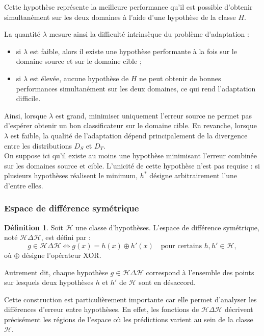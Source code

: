 \documentclass[a4paper,12pt]{article}
\theoremstyle{definition}
\newtheorem{definition}{Définition}[section]
\theoremstyle{remark}
\begin{document}
Cette hypothèse représente la meilleure performance qu’il est possible d’obtenir
simultanément sur les deux domaines à l’aide d’une hypothèse de la classe $H$.

La quantité $\lambda$ mesure ainsi la difficulté intrinsèque du problème d’adaptation :
\begin{itemize}
\item si $\lambda$ est faible, alors il existe une hypothèse performante à la fois sur le domaine source et sur le domaine cible ;
\item si $\lambda$ est élevée, aucune hypothèse de $H$ ne peut obtenir de bonnes performances simultanément sur les deux domaines, ce qui rend l’adaptation difficile.
\end{itemize}

Ainsi, lorsque $\lambda$ est grand, minimiser uniquement l’erreur source ne permet pas
d’espérer obtenir un bon classificateur sur le domaine cible. En revanche, lorsque $\lambda$
est faible, la qualité de l’adaptation dépend principalement de la divergence entre les
distributions $D_S$ et $D_T$.\\



On suppose ici qu’il existe au moins une hypothèse minimisant l’erreur combinée
sur les domaines source et cible. L’unicité de cette hypothèse n’est pas requise :
si plusieurs hypothèses réalisent le minimum, $h^*$ désigne arbitrairement l’une
d’entre elles.

\subsubsection{Espace de différence symétrique}

\begin{definition}
Soit $\mathcal{H}$ une classe d’hypothèses. L’espace de différence symétrique, noté $\mathcal{H} \Delta \mathcal{H}$, est défini par :
\[
g \in \mathcal{H} \Delta \mathcal{H} \iff g(x) = h(x) \oplus h'(x) \quad \text{pour certains } h, h' \in \mathcal{H},
\]
où $\oplus$ désigne l’opérateur XOR.
\end{definition}

Autrement dit, chaque hypothèse $g \in \mathcal{H} \Delta \mathcal{H}$ correspond à l’ensemble des points sur lesquels deux hypothèses $h$ et $h'$ de $\mathcal{H}$ sont en désaccord.

Cette construction est particulièrement importante car elle permet d’analyser les différences d’erreur entre hypothèses. En effet, les fonctions de $\mathcal{H} \Delta \mathcal{H}$ décrivent précisément les régions de l’espace où les prédictions varient au sein de la classe $\mathcal{H}$.
\end{document}
